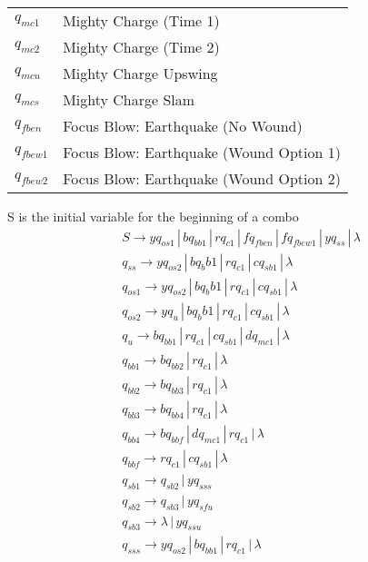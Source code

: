 \documentclass{article}
\begin{document}
\begin{mylist}
\begin{table}[h]
\begin{tabular}{l | l}
    $q_{mc1}$ & Mighty Charge (Time 1)\\
    $q_{mc2}$ & Mighty Charge (Time 2)\\
    $q_{mcu}$ & Mighty Charge Upswing\\
    $q_{mcs}$ & Mighty Charge Slam\\
    $q_{fben}$ & Focus Blow: Earthquake (No Wound)\\
    $q_{fbew1}$ & Focus Blow: Earthquake (Wound Option 1)\\
    $q_{fbew2}$ & Focus Blow: Earthquake (Wound Option 2)\\
  \end{tabular}
\end{table}
S is the initial variable for the beginning of a combo
\begin{align*}
&S \rightarrow yq_{os1} \, | \, bq_{bb1} \, | \, rq_{c1} \, | \, fq_{fben} \, | \, fq_{fbew1} \, | \, yq_{ss} \, | \, \lambda \\
&q_{ss} \rightarrow yq_{os2} \, | \, b{q_bb1} \, | \, rq_{c1} \, | \, cq_{sb1} \, | \, \lambda\\
&q_{os1} \rightarrow yq_{os2} \, | \, b{q_bb1} \, | \, rq_{c1} \, | \, cq_{sb1} \, | \, \lambda\\
&q_{os2} \rightarrow yq_{u} \, | \, b{q_bb1} \, | \, rq_{c1} \, | \, cq_{sb1} \, | \, \lambda\\
&q_{u} \rightarrow bq_{bb1} \, | \, rq_{c1} \, | \,cq_{sb1} \, | \, dq_{mc1} \, | \, \lambda\\
&q_{bb1} \rightarrow bq_{bb2} \, | \, rq_{c1} \, | \, \lambda \\ 
&q_{bb2} \rightarrow bq_{bb3} \, | \, rq_{c1} \, | \, \lambda \\ 
&q_{bb3} \rightarrow bq_{bb4} \, | \, rq_{c1} \, | \, \lambda \\ 
&q_{bb4} \rightarrow bq_{bbf} \, | \, dq_{mc1} \, | \, rq_{c1} \, | \, \lambda \\ 
&q_{bbf} \rightarrow rq_{c1} \, | \, cq_{sb1} \, | \, \lambda \\ 
&q_{sb1} \rightarrow q_{sb2} \, | \, yq_{sss} \\ 
&q_{sb2} \rightarrow q_{sb3} \, | \, yq_{sfu} \\ 
&q_{sb3} \rightarrow \lambda \, | \, yq_{ssu} \\ 
&q_{sss} \rightarrow yq_{os2} \, | \, bq_{bb1} \, | \, rq_{c1} \, | \, \lambda\\ 

\end{align*}
\end{mylist}
\end{document}
